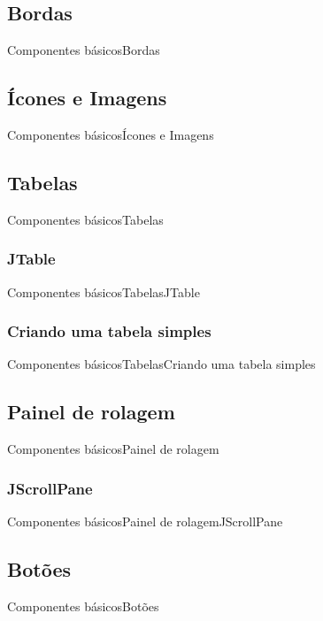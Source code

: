 \documentclass[10pt]{beamer}
\begin{document}
\subsection{Bordas}
\begin{frame}{Componentes básicos}{Bordas}
\end{frame}{}
\subsection{Ícones e Imagens}
\begin{frame}{Componentes básicos}{Ícones e Imagens}
\end{frame}{}
\subsection{Tabelas}
\begin{frame}{Componentes básicos}{Tabelas}
\end{frame}{}
\subsubsection{JTable}
\begin{frame}{Componentes básicos}{Tabelas}{JTable}
\end{frame}{}
\subsubsection{Criando uma tabela simples}
\begin{frame}{Componentes básicos}{Tabelas}{Criando uma tabela simples}
\end{frame}{}
\subsection{Painel de rolagem}
\begin{frame}{Componentes básicos}{Painel de rolagem}
\end{frame}{}
\subsubsection{JScrollPane}
\begin{frame}{Componentes básicos}{Painel de rolagem}{JScrollPane}
\end{frame}{}
\subsection{Botões}
\begin{frame}{Componentes básicos}{Botões}
\end{frame}{}
\end{document}
